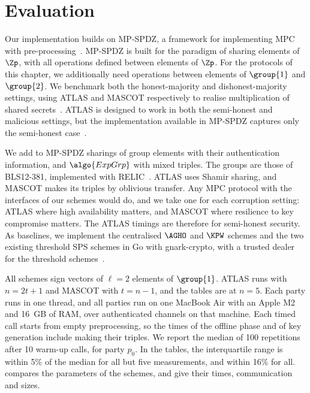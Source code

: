 \section{Evaluation}\label{sec:tsps-evaluation}

Our implementation builds on MP-SPDZ, a framework for implementing MPC with
pre-processing~\cite{CCS:Keller20}. MP-SPDZ is built for the paradigm of sharing
elements of $\Zp$, with all operations defined between elements of $\Zp$. For
the protocols of this chapter, we additionally need operations between elements
of $\group{1}$ and $\group{2}$. We benchmark both the honest-majority and
dishonest-majority settings, using ATLAS and MASCOT respectively to realise
multiplication of shared secrets~\cite{CCS:KelOrsSch16,C:GLOPS21}. ATLAS is
designed to work in both the semi-honest and malicious settings, but the
implementation available in MP-SPDZ captures only the semi-honest
case~\cite{CCS:Keller20}.

We add to MP-SPDZ sharings of group elements with their authentication
information, and $\algo{ExpGrp}$ with mixed triples. The groups are those of
BLS12-381, implemented with RELIC~\cite{relictoolkit}. ATLAS uses Shamir sharing,
and MASCOT makes its triples by oblivious transfer. Any MPC protocol with the
interfaces of our schemes would do, and we take one for each corruption setting:
ATLAS where high availability matters, and MASCOT where resilience to key compromise
matters. The ATLAS timings are therefore for semi-honest security. As baselines,
we implement the centralised $\AGHO$ and $\KPW$ schemes and the two existing
threshold SPS schemes in Go with gnark-crypto, with a trusted dealer for the
threshold schemes~\cite{AC:CKPSS23,PKC:MMSST24,gnark-crypto}.

All schemes sign vectors of $\ell = 2$ elements of $\group{1}$. ATLAS runs with
$n = 2t+1$ and MASCOT with $t = n-1$, and the tables are at $n = 5$. Each party
runs in one thread, and all parties run on one MacBook Air with an Apple M2 and
16~GB of RAM, over authenticated channels on that machine. Each timed call starts
from empty preprocessing, so the times of the offline phase and of key
generation include making their triples. We report the median of 100
repetitions after 10 warm-up calls, for party $p_0$. In the tables, the
interquartile range is within 5\% of the median for all but five measurements,
and within 16\% for all.
 compares the parameters of the schemes, and
give their times, communication and sizes.


